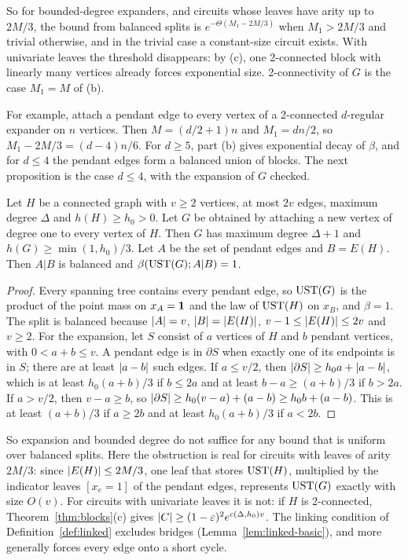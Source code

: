 So for bounded-degree expanders, and circuits whose leaves have arity up to $2M/3$, the bound from balanced splits is $e^{-\Theta(M_1-2M/3)}$ when $M_1>2M/3$ and trivial otherwise, and in the trivial case a constant-size circuit exists. With univariate leaves the threshold disappears: by (c), one 2-connected block with linearly many vertices already forces exponential size. 2-connectivity of $G$ is the case $M_1=M$ of (b).

For example, attach a pendant edge to every vertex of a 2-connected $d$-regular expander on $n$ vertices. Then $M=(d/2+1)n$ and $M_1=dn/2$, so $M_1-2M/3=(d-4)n/6$. For $d\ge5$, part (b) gives exponential decay of $\beta$, and for $d\le4$ the pendant edges form a balanced union of blocks. The next proposition is the case $d\le4$, with the expansion of $G$ checked.

\begin{proposition}\label{prop:pendant}
Let $H$ be a connected graph with $v\ge2$ vertices, at most $2v$ edges, maximum degree $\Delta$ and $h(H)\ge h_0>0$. Let $G$ be obtained by attaching a new vertex of degree one to every vertex of $H$. Then $G$ has maximum degree $\Delta+1$ and $h(G)\ge\min(1,h_0)/3$. Let $A$ be the set of pendant edges and $B=E(H)$. Then $A|B$ is balanced and $\beta(\mathrm{UST}(G);A|B)=1$.
\end{proposition}

\begin{proof}
Every spanning tree contains every pendant edge, so $\mathrm{UST}(G)$ is the product of the point mass on $x_A=\mathbf{1}$ and the law of $\mathrm{UST}(H)$ on $x_B$, and $\beta=1$. The split is balanced because $\lvert A\rvert=v$, $\lvert B\rvert=\lvert E(H)\rvert$, $v-1\le\lvert E(H)\rvert\le2v$ and $v\ge2$. For the expansion, let $S$ consist of $a$ vertices of $H$ and $b$ pendant vertices, with $0<a+b\le v$. A pendant edge is in $\partial S$ when exactly one of its endpoints is in $S$; there are at least $\lvert a-b\rvert$ such edges. If $a\le v/2$, then $\lvert \partial S\rvert\ge h_0a+\lvert a-b\rvert$, which is at least $h_0(a+b)/3$ if $b\le2a$ and at least $b-a\ge(a+b)/3$ if $b>2a$. If $a>v/2$, then $v-a\ge b$, so $\lvert \partial S\rvert\ge h_0(v-a)+(a-b)\ge h_0b+(a-b)$. This is at least $(a+b)/3$ if $a\ge2b$ and at least $h_0(a+b)/3$ if $a<2b$.
\end{proof}

So expansion and bounded degree do not suffice for any bound that is uniform over balanced splits. Here the obstruction is real for circuits with leaves of arity $2M/3$: since $\lvert E(H)\rvert\le2M/3$, one leaf that stores $\mathrm{UST}(H)$, multiplied by the indicator leaves $[x_e=1]$ of the pendant edges, represents $\mathrm{UST}(G)$ exactly with size $O(v)$. For circuits with univariate leaves it is not: if $H$ is 2-connected, Theorem~\ref{thm:blocks}(c) gives $\lvert C\rvert\ge(1-\varepsilon)^2e^{c(\Delta,h_0)v}$. The linking condition of Definition~\ref{def:linked} excludes bridges (Lemma~\ref{lem:linked-basic}), and more generally forces every edge onto a short cycle.

